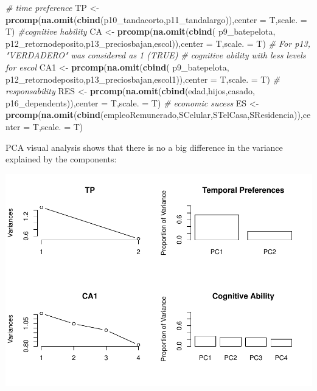\documentclass[]{article}
\newenvironment{Shaded}{\begin{snugshade}}{\end{snugshade}}
\newcommand{\KeywordTok}[1]{\textcolor[rgb]{0.13,0.29,0.53}{\textbf{#1}}}
\newcommand{\DataTypeTok}[1]{\textcolor[rgb]{0.13,0.29,0.53}{#1}}
\newcommand{\StringTok}[1]{\textcolor[rgb]{0.31,0.60,0.02}{#1}}
\newcommand{\CommentTok}[1]{\textcolor[rgb]{0.56,0.35,0.01}{\textit{#1}}}
\newcommand{\NormalTok}[1]{#1}
\begin{document}
\begin{Shaded}
\begin{Highlighting}[]
\CommentTok{# time preference}
\NormalTok{TP <-}\StringTok{ }\KeywordTok{prcomp}\NormalTok{(}\KeywordTok{na.omit}\NormalTok{(}\KeywordTok{cbind}\NormalTok{(p10_tandacorto,p11_tandalargo)),}\DataTypeTok{center =}\NormalTok{ T,}\DataTypeTok{scale. =}\NormalTok{ T)}
\CommentTok{#cognitive hability}
\NormalTok{CA <-}\StringTok{ }\KeywordTok{prcomp}\NormalTok{(}\KeywordTok{na.omit}\NormalTok{(}\KeywordTok{cbind}\NormalTok{( p9_batepelota, p12_retornodeposito,p13_preciosbajan,escol)),}\DataTypeTok{center =}\NormalTok{ T,}\DataTypeTok{scale. =}\NormalTok{ T) }\CommentTok{# For p13, "VERDADERO" was considered as 1 (TRUE)}
\CommentTok{# cognitive ability with less levels for escol}
\NormalTok{CA1 <-}\StringTok{ }\KeywordTok{prcomp}\NormalTok{(}\KeywordTok{na.omit}\NormalTok{(}\KeywordTok{cbind}\NormalTok{( p9_batepelota, p12_retornodeposito,p13_preciosbajan,escol1)),}\DataTypeTok{center =}\NormalTok{ T,}\DataTypeTok{scale. =}\NormalTok{ T)}
\CommentTok{# responsability}
\NormalTok{RES <-}\StringTok{ }\KeywordTok{prcomp}\NormalTok{(}\KeywordTok{na.omit}\NormalTok{(}\KeywordTok{cbind}\NormalTok{(edad,hijos,casado, p16_dependents)),}\DataTypeTok{center =}\NormalTok{ T,}\DataTypeTok{scale. =}\NormalTok{ T)}
\CommentTok{# economic sucess}
\NormalTok{ES <-}\StringTok{ }\KeywordTok{prcomp}\NormalTok{(}\KeywordTok{na.omit}\NormalTok{(}\KeywordTok{cbind}\NormalTok{(empleoRemunerado,SCelular,STelCasa,SResidencia)),}\DataTypeTok{center =}\NormalTok{ T,}\DataTypeTok{scale. =}\NormalTok{ T)}
\end{Highlighting}
\end{Shaded}

PCA visual analysis shows that there is no a big difference in the
variance explained by the components:

\includegraphics{ProvidentRegressions_files/figure-latex/unnamed-chunk-5-1.pdf}
\end{document}
